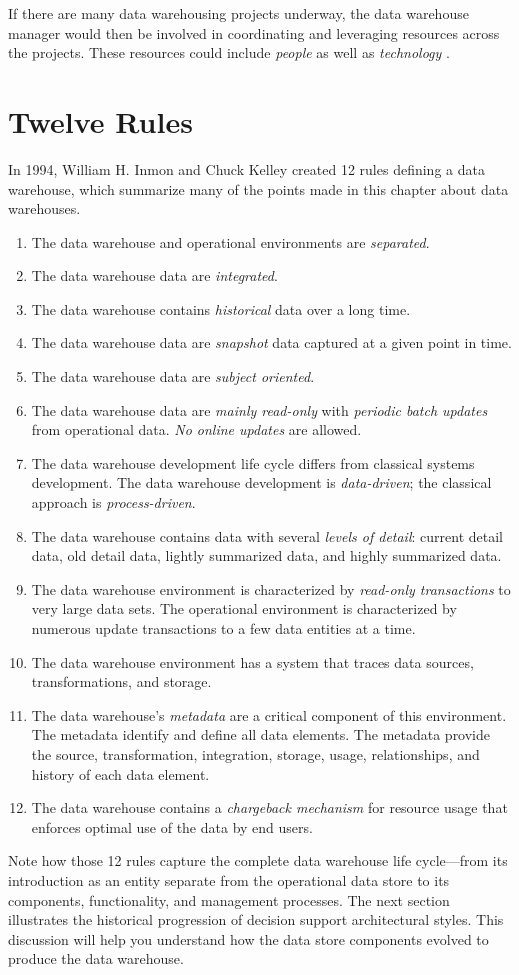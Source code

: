 \documentclass{vldb}
\newcommand{\be}{\begin{enumerate}}
\newcommand{\ee}{\end{enumerate}}
\newcommand{\ii}{\item}
\begin{document}
If there are many data warehousing projects underway, the data warehouse manager would then be involved in coordinating and leveraging resources across the projects. These resources could include \textit{people} as well as \textit{technology} .

\section{Twelve Rules} %
In 1994, William H. Inmon and Chuck Kelley created 12 rules defining a data warehouse, which summarize many of
the points made in this chapter about data warehouses.
\be
\ii The data warehouse and operational environments are \textit{separated}.
\ii The data warehouse data are \textit{integrated}.
\ii The data warehouse contains \textit{historical} data over a long time.
\ii The data warehouse data are \textit{snapshot} data captured at a given point in time.
\ii The data warehouse data are \textit{subject oriented}.
\ii The data warehouse data are \textit{mainly read-only} with \textit{periodic batch updates} from operational data. \textit{No online updates} are allowed.
\ii The data warehouse development life cycle differs from classical systems development. The data warehouse development is \textit{data-driven}; the classical approach is \textit{process-driven}.
\ii The data warehouse contains data with several \textit{levels of detail}: current detail data, old detail data, lightly
summarized data, and highly summarized data.
\ii The data warehouse environment is characterized by \textit{read-only transactions} to very large data sets. The
operational environment is characterized by numerous update transactions to a few data entities at a time.
\ii The data warehouse environment has a system that traces data sources, transformations, and storage.
\ii The data warehouse’s \textit{metadata} are a critical component of this environment. The metadata identify and define
all data elements. The metadata provide the source, transformation, integration, storage, usage, relationships,
and history of each data element.
\ii The data warehouse contains a \textit{chargeback mechanism} for resource usage that enforces optimal use of the data
by end users.
\ee

Note how those 12 rules capture the complete data warehouse life cycle—from its introduction as an entity separate
from the operational data store to its components, functionality, and management processes. The next section
illustrates the historical progression of decision support architectural styles. This discussion will help you understand
how the data store components evolved to produce the data warehouse.
\end{document}
